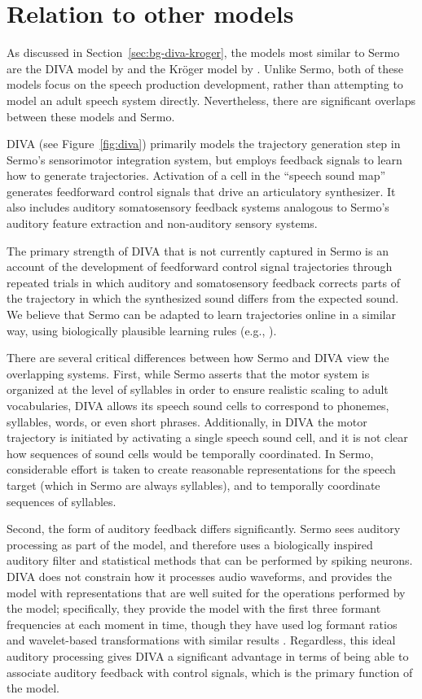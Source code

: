 \section{Relation to other models}

As discussed in Section~\ref{sec:bg-diva-kroger},
the models most similar to Sermo
are the DIVA model by \citeauthor{guenther1995}
and the Kr\"{o}ger model by \citeauthor{kroger2009}.
Unlike Sermo, both of these models
focus on the speech production development,
rather than attempting to model
an adult speech system directly.
Nevertheless, there are significant overlaps
between these models and Sermo.

DIVA (see Figure~\ref{fig:diva}) primarily models
the trajectory generation step
in Sermo's sensorimotor integration system,
but employs feedback signals to learn
how to generate trajectories.
Activation of a cell in the ``speech sound map''
generates feedforward control signals
that drive an articulatory synthesizer.
It also includes auditory somatosensory feedback systems
analogous to Sermo's auditory feature extraction
and non-auditory sensory systems.

The primary strength of DIVA
that is not currently captured in Sermo
is an account of the development
of feedforward control signal trajectories
through repeated trials in which
auditory and somatosensory feedback
corrects parts of the trajectory
in which the synthesized sound differs
from the expected sound.
We believe that Sermo can be adapted
to learn trajectories online in a similar way,
using biologically plausible learning rules
(e.g., \citealt{macneil2011,bekolay2013a}).

There are several critical differences
between how Sermo and DIVA view
the overlapping systems.
First, while Sermo asserts that
the motor system is organized at the level
of syllables in order to ensure
realistic scaling to adult vocabularies,
DIVA allows its speech sound cells to
correspond to phonemes, syllables, words,
or even short phrases.
Additionally, in DIVA
the motor trajectory is initiated
by activating a single speech sound cell,
and it is not clear how sequences
of sound cells would be temporally coordinated.
In Sermo, considerable effort is taken
to create reasonable representations
for the speech target
(which in Sermo are always syllables),
and to temporally coordinate
sequences of syllables.

Second, the form of auditory feedback
differs significantly.
Sermo sees auditory processing as part of
the model, and therefore uses
a biologically inspired auditory filter
and statistical methods that can be
performed by spiking neurons.
DIVA does not constrain
how it processes audio waveforms,
and provides the model with
representations that are well suited
for the operations performed by the model;
specifically, they provide the model with
the first three formant frequencies
at each moment in time,
though they have used log formant ratios
and wavelet-based transformations
with similar results \citep{guenther2006a}.
Regardless, this ideal auditory processing
gives DIVA a significant advantage
in terms of being able to
associate auditory feedback
with control signals,
which is the primary function of the model.

